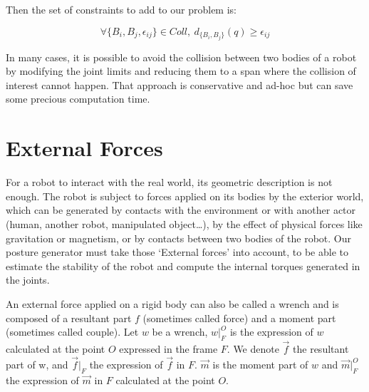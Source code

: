 Then the set of constraints to add to our problem is:

\begin{equation}
  \boxed{\forall \{B_i, B_j, \epsilon_{ij}\} \in Coll,\ d_{\{B_i, B_j\}}(q) \geq \epsilon_{ij}}
\end{equation}

In many cases, it is possible to avoid the collision between two bodies of a robot by modifying the joint limits and reducing them to a span where the collision of interest cannot happen.
That approach is conservative and ad-hoc but can save some precious computation time.




\section{External Forces}
\label{sec:external_forces}


For a robot to interact with the real world, its geometric description is not enough.
The robot is subject to forces applied on its bodies by the exterior world, which can be generated by contacts with the environment or with another actor (human, another robot, manipulated object\ldots), by the effect of physical forces like gravitation or magnetism, or by contacts between two bodies of the robot.
Our posture generator must take those `External forces' into account, to be able to estimate the stability of the robot and compute the internal torques generated in the joints.

An external force applied on a rigid body can also be called a wrench and is composed of a resultant part $f$ (sometimes called force) and a moment part (sometimes called couple).
Let $w$ be a wrench, $w|_F^O$ is the expression of $w$ calculated at the point $O$ expressed in the frame $F$.
We denote $\vec{f}$ the resultant part of w, and $\vec{f}|_F$ the expression of $\vec{f}$ in $F$.
$\vec{m}$ is the moment part of $w$ and $\vec{m}|_F^O$ the expression of $\vec{m}$ in $F$ calculated at the point $O$.

